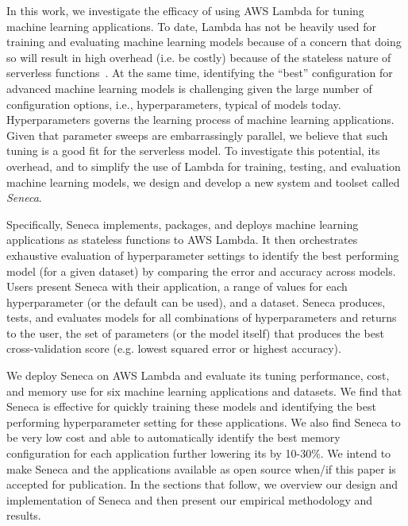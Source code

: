In this work, we investigate the efficacy of using AWS Lambda
for tuning machine learning applications.
To date, Lambda has not be heavily used for training and evaluating
machine learning models because of a concern that 
doing so will result in high overhead (i.e. be costly) because
of the stateless nature of serverless functions~\cite{ref:onesteptwostep}.
At the same time, identifying the ``best'' configuration for advanced
machine learning models is challenging given the large number of configuration
options, i.e., hyperparameters, typical of models today.
Hyperparameters governs the learning process of machine learning applications.
Given that parameter sweeps are embarrassingly parallel, we believe
that such tuning is a good fit for the serverless model.
To investigate this potential, its overhead, and to simplify the 
use of Lambda for training, testing, and evaluation machine learning models, 
we design and develop a new system and toolset called \textit{Seneca}.

Specifically, Seneca implements, packages, and deploys 
machine learning applications as stateless functions to AWS Lambda.
It then orchestrates exhaustive evaluation of hyperparameter settings
to identify the best performing model (for a given dataset) by
comparing the error and accuracy across models.  Users present
Seneca with their application, a range of values for 
each hyperparameter (or the default can be used), and a dataset.
Seneca produces, tests, and evaluates models for all combinations 
of hyperparameters and returns to the user, 
the set of parameters (or the model itself) that produces
the best cross-validation score (e.g. lowest squared error or highest
accuracy).

We deploy Seneca on AWS Lambda and evaluate its tuning performance, cost,
and memory use for six machine learning applications and datasets. We 
find that Seneca is effective for quickly training these
models and identifying the best performing hyperparameter setting for 
these applications. We also find 
Seneca to be very low cost and able to automatically 
identify the 
best memory configuration for each application further lowering its 
by 10-30\%.
We intend to make Seneca and the applications available as open source
when/if this paper is accepted for publication.  In the sections
that follow, we overview our design and implementation of Seneca and then
present our empirical methodology and results.


